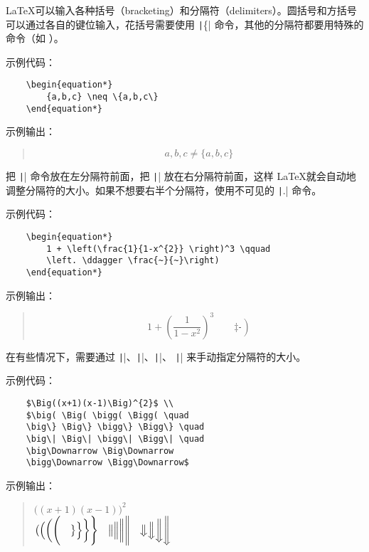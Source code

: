 \documentclass[UTF8]{ctexart}
\begin{document}
\LaTeX 可以输入各种括号（bracketing）和分隔符（delimiters）。圆括号和方括号可以通过各自的键位输入，花括号需要使用
\texttt|\{| 命令，其他的分隔符都要用特殊的命令（如 \texttt{\updownarrow}）。

示例代码：
\begin{verbatim}
    \begin{equation*}
        {a,b,c} \neq \{a,b,c\}
    \end{equation*}
\end{verbatim}

示例输出：
\begin{quote}
    \begin{equation*}
        {a,b,c} \neq \{a,b,c\}
    \end{equation*}
\end{quote}

把 \texttt|\left| 命令放在左分隔符前面，把 \texttt|\right| 放在右分隔符前面，这样
\LaTeX 就会自动地调整分隔符的大小。如果不想要右半个分隔符，使用不可见的 \texttt|\right.| 命令。

示例代码：
\begin{verbatim}
    \begin{equation*}
        1 + \left(\frac{1}{1-x^{2}} \right)^3 \qquad
        \left. \ddagger \frac{~}{~}\right)
    \end{equation*}
\end{verbatim}

示例输出：
\begin{quote}
    \begin{equation*}
        1 + \left(\frac{1}{1-x^{2}} \right)^3 \qquad
        \left. \ddagger \frac{~}{~}\right)
    \end{equation*}
\end{quote}

在有些情况下，需要通过 \texttt|\big|、\texttt|\Big|、\texttt|\bigg|、
\texttt|\Bigg| 来手动指定分隔符的大小。

示例代码：
\begin{verbatim}
    $\Big((x+1)(x-1)\Big)^{2}$ \\
    $\big( \Big( \bigg( \Bigg( \quad
    \big\} \Big\} \bigg\} \Bigg\} \quad
    \big\| \Big\| \bigg\| \Bigg\| \quad
    \big\Downarrow \Big\Downarrow
    \bigg\Downarrow \Bigg\Downarrow$
\end{verbatim}

示例输出：
\begin{quote}
    $\Big((x+1)(x-1)\Big)^{2}$ \\
    $\big( \Big( \bigg( \Bigg( \quad
    \big\} \Big\} \bigg\} \Bigg\} \quad
    \big\| \Big\| \bigg\| \Bigg\| \quad
    \big\Downarrow \Big\Downarrow
    \bigg\Downarrow \Bigg\Downarrow$
\end{quote}
\end{document}
